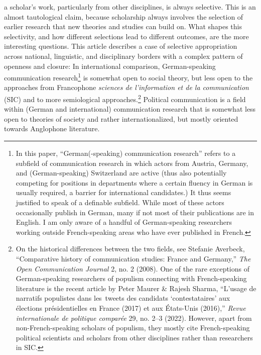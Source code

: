 \documentclass{tufte-handout}
\begin{document}
 a scholar's work, particularly from other disciplines,
is always selective. This is an almost tautological claim, because
scholarship always involves the selection of earlier research that new
theories and studies can build on. What shapes this selectivity, and how
different selections lead to different outcomes, are the more
interesting questions. This article describes a case of selective
appropriation across national, linguistic, and disciplinary borders with
a complex pattern of openness and closure: In international comparison,
German-speaking communication research\footnote{In this paper,
  ``German(-speaking) communication research'' refers to a subfield of
  communication research in which actors from Austria, Germany, and
  (German-speaking) Switzerland are active (thus also potentially
  competing for positions in departments where a certain fluency in
  German is usually required, a barrier for international candidates.)
  It thus seems justified to speak of a definable subfield. While most
  of these actors occasionally publish in German, many if not most of
  their publications are in English. I am only aware of a handful of
  German-speaking researchers working outside French-speaking areas who
  have ever published in French.} is somewhat open to social theory, but
less open to the approaches from Francophone \emph{sciences de
l'information et de la communication} (SIC) and to more semiological
approaches.\footnote{On the historical differences between the two
  fields, see Stefanie Averbeck, ``Comparative history of communication
  studies: France and Germany,'' \emph{The Open Communication Journal}
  2, no. 2 (2008). One of the rare exceptions of German-speaking
  researchers of populism connecting with French-speaking literature is
  the recent article by Peter Maurer \& Rajesh Sharma, ``L'usage de
  narratifs populistes dans les~tweets des candidats `contestataires'
  aux élections présidentielles en France (2017) et aux États-Unis
  (2016),'' \emph{Revue internationale de politique comparée} 29, no.
  2--3 (2022). However, apart from non-French-speaking scholars of
  populism, they mostly cite French-speaking political scientists and
  scholars from other disciplines rather than researchers in SIC.}
Political communication is a field within (German and international)
communication research that is somewhat less open to theories of society
and rather internationalized, but mostly oriented towards Anglophone
literature.

\enlargethispage{\baselineskip}
\end{document}
